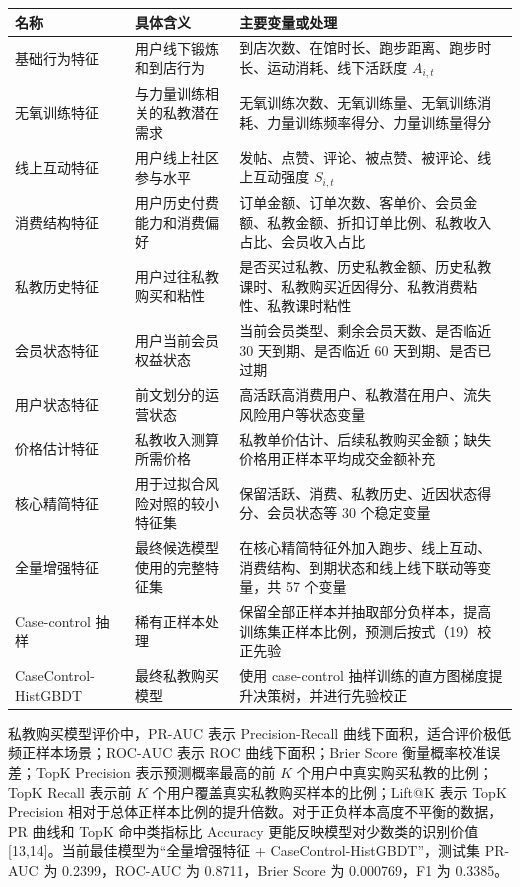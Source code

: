 \documentclass[
  12pt,
]{ctexart}
\begin{document}
\begingroup
\small
\begin{longtable}[]{@{}
  >{\raggedright\arraybackslash}p{2.7cm}
  >{\raggedright\arraybackslash}p{3.8cm}
  >{\raggedright\arraybackslash}p{8.2cm}@{}}
\toprule
名称 & 具体含义 & 主要变量或处理 \\
\midrule
\endhead
基础行为特征 & 用户线下锻炼和到店行为 & 到店次数、在馆时长、跑步距离、跑步时长、运动消耗、线下活跃度 \(A_{i,t}\) \\
无氧训练特征 & 与力量训练相关的私教潜在需求 & 无氧训练次数、无氧训练量、无氧训练消耗、力量训练频率得分、力量训练量得分 \\
线上互动特征 & 用户线上社区参与水平 & 发帖、点赞、评论、被点赞、被评论、线上互动强度 \(S_{i,t}\) \\
消费结构特征 & 用户历史付费能力和消费偏好 & 订单金额、订单次数、客单价、会员金额、私教金额、折扣订单比例、私教收入占比、会员收入占比 \\
私教历史特征 & 用户过往私教购买和粘性 & 是否买过私教、历史私教金额、历史私教课时、私教购买近因得分、私教消费粘性、私教课时粘性 \\
会员状态特征 & 用户当前会员权益状态 & 当前会员类型、剩余会员天数、是否临近 30 天到期、是否临近 60 天到期、是否已过期 \\
用户状态特征 & 前文划分的运营状态 & 高活跃高消费用户、私教潜在用户、流失风险用户等状态变量 \\
价格估计特征 & 私教收入测算所需价格 & 私教单价估计、后续私教购买金额；缺失价格用正样本平均成交金额补充 \\
核心精简特征 & 用于过拟合风险对照的较小特征集 & 保留活跃、消费、私教历史、近因状态得分、会员状态等 30 个稳定变量 \\
全量增强特征 & 最终候选模型使用的完整特征集 & 在核心精简特征外加入跑步、线上互动、消费结构、到期状态和线上线下联动等变量，共 57 个变量 \\
Case-control 抽样 & 稀有正样本处理 & 保留全部正样本并抽取部分负样本，提高训练集正样本比例，预测后按式（19）校正先验 \\
CaseControl-HistGBDT & 最终私教购买模型 & 使用 case-control 抽样训练的直方图梯度提升决策树，并进行先验校正 \\
\bottomrule
\end{longtable}
\endgroup

私教购买模型评价中，PR-AUC 表示 Precision-Recall 曲线下面积，适合评价极低频正样本场景；ROC-AUC 表示 ROC 曲线下面积；Brier Score 衡量概率校准误差；TopK Precision 表示预测概率最高的前 \(K\) 个用户中真实购买私教的比例；TopK Recall 表示前 \(K\) 个用户覆盖真实私教购买样本的比例；Lift@K 表示 TopK Precision 相对于总体正样本比例的提升倍数。对于正负样本高度不平衡的数据，PR 曲线和 TopK 命中类指标比 Accuracy 更能反映模型对少数类的识别价值{[}13,14{]}。当前最佳模型为``全量增强特征 + CaseControl-HistGBDT''，测试集 PR-AUC 为 0.2399，ROC-AUC 为 0.8711，Brier Score 为 0.000769，F1 为 0.3385。
\end{document}
